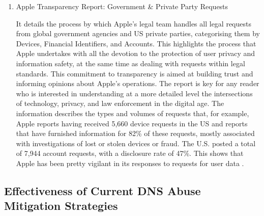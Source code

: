\begin{enumerate}
 \item Apple Transparency Report: Government \& Private Party Requests 

It details the process by which Apple's legal team handles all legal requests from global government agencies and US private parties, categorising them by Devices, Financial Identifiers, and Accounts. This highlights the process that Apple undertakes with all the devotion to the protection of user privacy and information safety, at the same time as dealing with requests within legal standards. This commitment to transparency is aimed at building trust and informing opinions about Apple's operations. The report is key for any reader who is interested in understanding at a more detailed level the intersections of technology, privacy, and law enforcement in the digital age. The information describes the types and volumes of requests that, for example, Apple reports having received 5,660 device requests in the US and reports that have furnished information for 82\% of these requests, mostly associated with investigations of lost or stolen devices or fraud. The U.S. posted a total of 7,944 account requests, with a disclosure rate of 47\%. This shows that Apple has been pretty vigilant in its responses to requests for user data \cite{AppleTransparencyReportGB}.


\end{enumerate}

\subsection{Effectiveness of Current DNS Abuse Mitigation Strategies}

